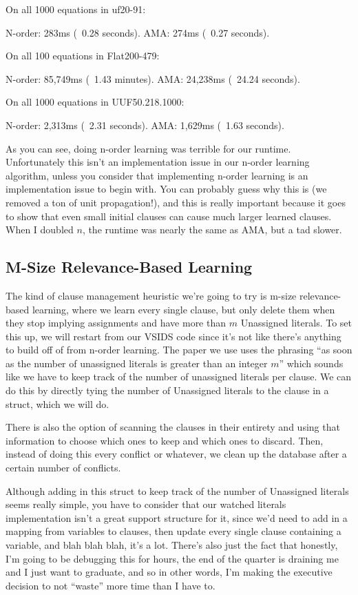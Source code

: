 \begin{FVerbatim}
On all 1000 equations in uf20-91:

N-order:   283ms (~0.28 seconds).
AMA:       274ms (~0.27 seconds).

On all 100 equations in Flat200-479:

N-order:   85,749ms (~1.43 minutes).
AMA:       24,238ms (~24.24 seconds).

On all 1000 equations in UUF50.218.1000:

N-order:   2,313ms (~2.31 seconds).
AMA:       1,629ms (~1.63 seconds).
\end{FVerbatim}
\noindent
As you can see, doing n-order learning was terrible for our runtime. Unfortunately 
this isn't an implementation issue in our n-order learning algorithm, unless you 
consider that implementing n-order learning is an implementation issue to begin with.
You can probably guess why this is (we removed a ton of unit propagation!), and this 
is really important because it goes to show that even small initial clauses can cause 
much larger learned clauses. When I doubled $n$, the runtime was nearly the same as 
AMA, but a tad slower. 

\subsection{M-Size Relevance-Based Learning}

The kind of clause management heuristic we're going to try is m-size relevance-based 
learning, where we learn every single clause, but only delete them when they stop 
implying assignments and have more than $m$ Unassigned literals. To set this up, 
we will restart from our VSIDS code since it's not like there's anything to build off of 
from n-order learning. The paper we use uses the phrasing ``as soon as the number of
unassigned literals is greater than an integer $m$'' which sounds like we have to keep 
track of the number of unassigned literals per clause. We can do this by directly tying 
the number of Unassigned literals to the clause in a struct, which we will do. 

There is also the option of scanning the clauses in their entirety and using that information 
to choose which ones to keep and which ones to discard. Then, instead of doing this every 
conflict or whatever, we clean up the database after a certain number of conflicts.

Although adding in this struct to keep track of the number of Unassigned literals seems 
really simple, you have to consider that our watched literals implementation isn't a great 
support structure for it, since we'd need to add in a mapping from variables to clauses,
then update every single clause containing a variable, and blah blah blah, it's a lot.
There's also just the fact that honestly, I'm going to be debugging this for hours, the 
end of the quarter is draining me and I just want to graduate, and so in other words,
I'm making the executive decision to not ``waste'' more time than I have to.

